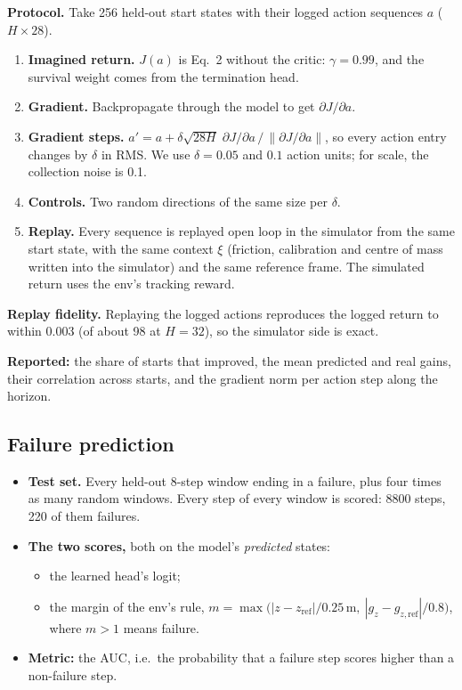 \documentclass[10pt]{article}
\begin{document}
\textbf{Protocol.} Take 256 held-out start states with their logged action sequences $a$
($H \times 28$).
\begin{enumerate}
  \item \textbf{Imagined return.} $J(a)$ is Eq.~2 without the critic: $\gamma = 0.99$, and the survival
  weight comes from the termination head.
  \item \textbf{Gradient.} Backpropagate through the model to get $\partial J/\partial a$.
  \item \textbf{Gradient steps.} $a' = a + \delta\sqrt{28H}\;\partial J/\partial a \,/\, \|\partial
  J/\partial a\|$, so every action entry changes by $\delta$ in RMS. We use $\delta = 0.05$ and $0.1$
  action units; for scale, the collection noise is 0.1.
  \item \textbf{Controls.} Two random directions of the same size per $\delta$.
  \item \textbf{Replay.} Every sequence is replayed open loop in the simulator from the same start
  state, with the same context $\xi$ (friction, calibration and centre of mass written into the
  simulator) and the same reference frame. The simulated return uses the env's tracking reward.
\end{enumerate}

\textbf{Replay fidelity.} Replaying the logged actions reproduces the logged return to within 0.003
(of about 98 at $H=32$), so the simulator side is exact.

\textbf{Reported:} the share of starts that improved, the mean predicted and real gains, their
correlation across starts, and the gradient norm per action step along the horizon.

\subsection{Failure prediction}

\begin{itemize}
  \item \textbf{Test set.} Every held-out 8-step window ending in a failure, plus four times as many
  random windows. Every step of every window is scored: 8800 steps, 220 of them failures.
  \item \textbf{The two scores,} both on the model's \emph{predicted} states:
  \begin{itemize}
    \item the learned head's logit;
    \item the margin of the env's rule,
    $m = \max\big(|z - z_{\mathrm{ref}}|/0.25\,\mathrm m,\ |g_z - g_{z,\mathrm{ref}}|/0.8\big)$, where
    $m > 1$ means failure.
  \end{itemize}
  \item \textbf{Metric:} the AUC, i.e.\ the probability that a failure step scores higher than a
  non-failure step.
\end{itemize}
\end{document}
